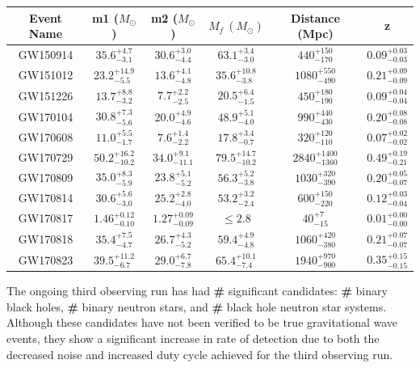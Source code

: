 \documentclass [12pt, proquest]{uwthesis}[2019]
\begin{document}
\begin{center}
\begin{tabular}{| c | c | c | c | c | c |}
\hline
Event Name & m1 ($M_\odot$) & m2 ($M_\odot$) & $M_f\ (M_\odot)$ & Distance (Mpc) & z\\
\hline \hline
GW150914 & $35.6^{+4.7}_{-3.1}$ & $30.6^{+3.0}_{-4.4}$ & $63.1^{+3.4}_{-3.0}$ & $440^{+150}_{-170}$ & $0.09^{+0.03}_{-0.03}$\\
\hline
GW151012 & $23.2^{+14.9}_{-5.5}$ & $13.6^{+4.1}_{-4.8}$  & $35.6^{+10.8}_{-3.8}$ & $1080^{+550}_{-490}$& $0.21^{+0.09}_{-0.09}$\\
\hline
GW151226 & $13.7^{+8.8}_{-3.2}$ & $7.7^{+2.2}_{-2.5}$ & $20.5^{+6.4}_{-1.5}$ & $450^{+180}_{-190}$ & $0.09^{+0.04}_{-0.04}$\\
\hline
GW170104 & $30.8^{+7.3}_{-5.6}$ & $20.0^{+4.9}_{-4.6}$ & $48.9^{+5.1}_{-4.0}$ & $990^{+440}_{-430}$ & $0.20^{+0.08}_{-0.08}$\\
\hline
GW170608 & $11.0^{+5.5}_{-1.7}$ & $7.6^{+1.4}_{-2.2}$ & $17.8^{+3.4}_{-0.7}$ & $320^{+120}_{-110}$ & $0.07^{+0.02}_{-0.02}$\\
\hline
GW170729 & $50.2^{+16.2}_{-10.2}$ & $34.0^{+9.1}_{-11.1}$ & $79.5^{+14.7}_{-10.2}$ & $2840^{+1400}_{-1360}$ & $0.49^{+0.19}_{-0.21}$\\
\hline
GW170809 & $35.0^{+8.3}_{-5.9}$ & $23.8^{+5.1}_{-5.2}$ & $56.3^{+5.2}_{-3.8}$ & $1030^{+320}_{-390}$ & $0.20^{+0.05}_{-0.07}$\\
\hline
GW170814 & $30.6^{+5.6}_{-3.0}$ & $25.2^{+2.8}_{-4.0}$ & $53.2^{+3.2}_{-2.4}$ & $600^{+150}_{-220}$ & $0.12^{+0.03}_{-0.04}$\\
\hline
GW170817 & $1.46^{+0.12}_{-0.10}$ & $1.27^{+0.09}_{-0.09}$ & $\le2.8$ & $40^{+7}_{-15}$ & $0.01^{+0.00}_{-0.00}$\\
\hline
GW170818 & $35.4^{+7.5}_{-4.7}$ & $26.7^{+4.3}_{-5.2}$ & $59.4^{+4.9}_{-4.8}$ & $1060^{+420}_{-380}$ & $0.21^{+0.07}_{-0.07}$\\
\hline
GW170823 & $39.5^{+11.2}_{-6.7}$ & $29.0^{+6.7}_{-7.8}$ & $65.4^{+10.1}_{-7.4}$ & $1940^{+970}_{-900}$ & $0.35^{+0.15}_{-0.15}$\\
\hline
\end{tabular}
\label{gwTable}
\end{center}

The ongoing third observing run has had \textbf{\#} significant candidates: \textbf{\#} binary black holes, \textbf{\#} binary neutron stars, and \textbf{\#} black hole neutron star systems. Although these candidates have not been verified to be true gravitational wave events, they show a significant increase in rate of detection due to both the decreased noise and increased duty cycle achieved for the third observing run.
\end{document}
